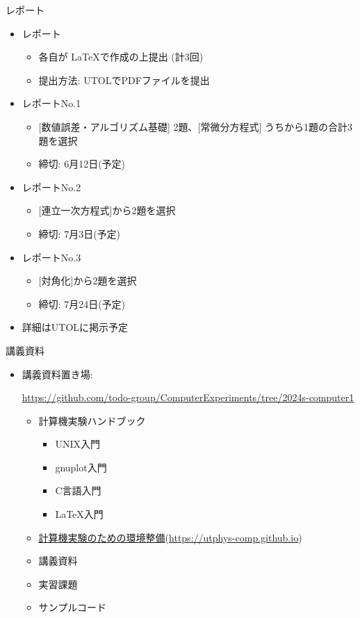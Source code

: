 \begin{frame}[t,fragile]{レポート}
  \begin{itemize}
  \item レポート
    \begin{itemize}
    \item 各自が \LaTeX で作成の上提出 (計3回)
    \item 提出方法: UTOLでPDFファイルを提出
    \end{itemize}
  \item レポートNo.1
    \begin{itemize}
    \item \mbox{} [数値誤差・アルゴリズム基礎] 2題、[常微分方程式] うちから1題の合計3題を選択
    \item 締切: 6月12日(予定)
    \end{itemize}
  \item レポートNo.2
    \begin{itemize}
    \item \mbox{} [連立一次方程式]から2題を選択
    \item 締切: 7月3日(予定)
    \end{itemize}
  \item レポートNo.3
    \begin{itemize}
    \item \mbox{} [対角化]から2題を選択
    \item 締切: 7月24日(予定)
    \end{itemize}
  \item 詳細はUTOLに掲示予定
  \end{itemize}    
\end{frame}

\begin{frame}[t]{講義資料}
  \begin{itemize}
  \item 講義資料置き場:
  
    {\footnotesize \href{https://github.com/todo-group/ComputerExperiments/tree/2024s-computer1}{https://github.com/todo-group/ComputerExperiments/tree/2024s-computer1}}
    \begin{itemize}
    \item 計算機実験ハンドブック
      \begin{itemize}
      \item UNIX入門
      \item gnuplot入門
      \item C言語入門
      \item \LaTeX 入門
      \end{itemize}
    \item \href{https://utphys-comp.github.io}{計算機実験のための環境整備}({\small \href{https://utphys-comp.github.io}{https://utphys-comp.github.io}})
    \item 講義資料
    \item 実習課題
    \item サンプルコード
    \end{itemize}
  \end{itemize}
\end{frame}

